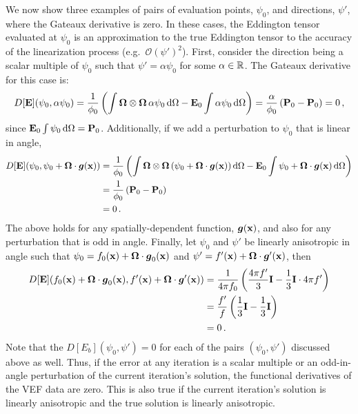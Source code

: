 \documentclass[../doc.tex]{subfiles}
\begin{document}
We now show three examples of pairs of evaluation points, $\psi_0$, and directions, $\psi'$, where the Gateaux derivative is zero. In these cases, the Eddington tensor evaluated at $\psi_0$ is an approximation to the true Eddington tensor to the accuracy of the linearization process (e.g.~$\mathcal{O}(\psi')^2$). 
First, consider the direction being a scalar multiple of $\psi_0$ such that $\psi' = \alpha \psi_0$ for some $\alpha \in \mathbb{R}$. The Gateaux derivative for this case is: 
	\begin{equation}
		D[\boldsymbol{\mathrm{E}}](\psi_0,\alpha\psi_0) = \frac{1}{\phi_0}\left( \int \boldsymbol{\Omega}\otimes\boldsymbol{\Omega}\,\alpha\psi_0 \mathop{}\!\mathrm{d}\Omega - \boldsymbol{\mathrm{E}}_0 \int \alpha \psi_0 \mathop{}\!\mathrm{d} \Omega \right) = \frac{\alpha}{\phi_0}\left( \boldsymbol{\mathrm{P}}_0 - \boldsymbol{\mathrm{P}}_0 \right) = 0 \,,
	\end{equation}
since $\boldsymbol{\mathrm{E}}_0 \int \psi_0 \mathop{}\!\mathrm{d} \Omega = \boldsymbol{\mathrm{P}}_0$. 
Additionally, if we add a perturbation to $\psi_0$ that is linear in angle, 
	\begin{equation}
	\begin{aligned}
		D[\boldsymbol{\mathrm{E}}](\psi_0, \psi_0 + \boldsymbol{\Omega}\cdot\boldsymbol{g}(\boldsymbol{\mathrm{x}})) &= \frac{1}{\phi_0}\left( \int \boldsymbol{\Omega}\otimes\boldsymbol{\Omega}\left( \psi_0 + \boldsymbol{\Omega}\cdot\boldsymbol{g}(\boldsymbol{\mathrm{x}}) \right)\mathop{}\!\mathrm{d} \Omega - \boldsymbol{\mathrm{E}}_0 \int \psi_0 + \boldsymbol{\Omega}\cdot\boldsymbol{g}(\boldsymbol{\mathrm{x}}) \mathop{}\!\mathrm{d} \Omega \right)\\
		&= \frac{1}{\phi_0} \left( \boldsymbol{\mathrm{P}}_0 - \boldsymbol{\mathrm{P}}_0 \right) \\
		&= 0 \,. 
	\end{aligned}
	\end{equation}
The above holds for any spatially-dependent function, $\boldsymbol{g}(\boldsymbol{\mathrm{x}})$, and also for any perturbation that is odd in angle. 
Finally, let $\psi_0$ and $\psi'$ be linearly anisotropic in angle such that $\psi_0 = f_0(\boldsymbol{\mathrm{x}}) + \boldsymbol{\Omega}\cdot\boldsymbol{g}_0(\boldsymbol{\mathrm{x}})$ and $\psi' = f'(\boldsymbol{\mathrm{x}}) + \boldsymbol{\Omega}\cdot\boldsymbol{g}'(\boldsymbol{\mathrm{x}})$, then 
	\begin{equation}
	\begin{aligned}
		D[\boldsymbol{\mathrm{E}}](f_0(\boldsymbol{\mathrm{x}}) + \boldsymbol{\Omega}\cdot\boldsymbol{g}_0(\boldsymbol{\mathrm{x}}), f'(\boldsymbol{\mathrm{x}}) + \boldsymbol{\Omega}\cdot\boldsymbol{g}'(\boldsymbol{\mathrm{x}})) &= \frac{1}{4\pi f_0}\left( \frac{4\pi f'}{3}\boldsymbol{\mathrm{I}} - \frac{1}{3}\boldsymbol{\mathrm{I}} \cdot 4\pi f' \right) \\
		&= \frac{f'}{f}\left( \frac{1}{3}\boldsymbol{\mathrm{I}} - \frac{1}{3}\boldsymbol{\mathrm{I}} \right) \\
		&= 0 \,. 
	\end{aligned}
	\end{equation}
Note that the $D[E_b](\psi_0,\psi') = 0$ for each of the pairs $(\psi_0,\psi')$ discussed above as well. 
Thus, if the error at any iteration is a scalar multiple or an odd-in-angle perturbation of the current iteration's solution, the functional derivatives of the VEF data are zero. This is also true if the current iteration's solution is linearly anisotropic and the true solution is linearly anisotropic. 
\end{document}
